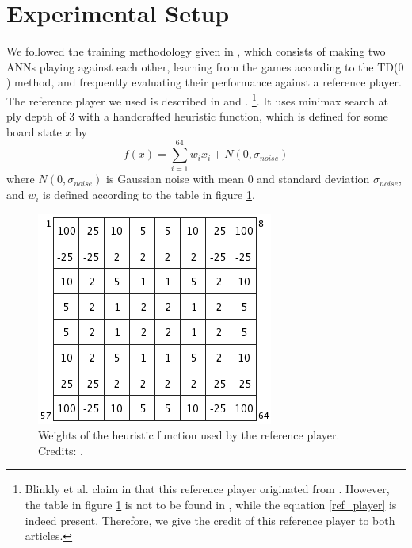 \documentclass[a4paper, 9pt, twoside, twocolumn]{article}
\begin{document}
\section{Experimental Setup}
\label{sec:experiment}
We followed the training methodology given in \cite{Binkly2007}, which consists
of making two ANNs playing against each other, learning from the games according
to the TD($0$) method, and frequently evaluating their performance against a
reference player. The reference player we used is described in \cite{Binkly2007}
and \cite{Yoshika1999}. \footnote{Blinkly et al. claim in \cite{Binkly2007} that
this reference player originated from \cite{Yoshika1999}. However, the table in
figure \ref{heuristic_board} is not to be found in \cite{Yoshika1999}, while the
equation \ref{ref_player} is indeed present. Therefore, we give the credit of
this reference player to both articles.}. It uses minimax search at ply depth of 3 with a
handcrafted heuristic function, which is defined for some board state $x$ by
\begin{equation}
\label{ref_player}
f(x) = \sum_{i=1}^{64} w_i x_i + N(0, \sigma_{noise})
\end{equation}
where $N(0, \sigma_{noise})$ is Gaussian noise with mean $0$ and standard
deviation $\sigma_{noise}$, and $w_i$ is defined according to the table in
figure \ref{heuristic_board}.

\begin{figure}
    \centering
    \includegraphics[width=0.75\linewidth]{heuristic_board}
    \caption{Weights of the heuristic function used by the reference player. Credits:
        \cite{Binkly2007}.}
    \label{heuristic_board}
\end{figure}
\end{document}
